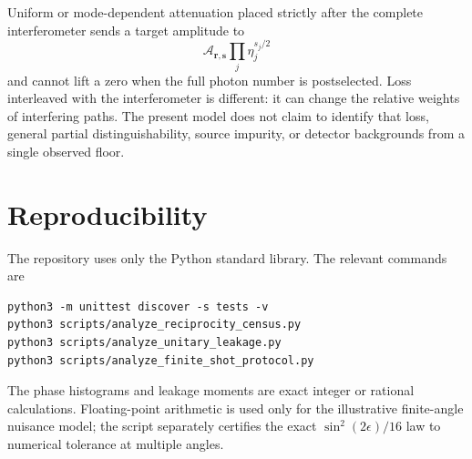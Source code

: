 \documentclass[aps,pra,onecolumn,amsmath,amssymb,superscriptaddress,longbibliography]{revtex4-2}
\begin{document}
Uniform or mode-dependent attenuation placed strictly after the complete
interferometer sends a target amplitude to
\begin{equation}
\mathcal A_{\bm r,\bm s}\prod_j\eta_j^{s_j/2}
\end{equation}
and cannot lift a zero when the full photon number is postselected.
Loss interleaved with the interferometer is different: it can change the
relative weights of interfering paths.  The present model does not claim to
identify that loss, general partial distinguishability, source impurity, or
detector backgrounds from a single observed floor.

\section{Reproducibility}

The repository uses only the Python standard library.  The relevant commands
are
\begin{verbatim}
python3 -m unittest discover -s tests -v
python3 scripts/analyze_reciprocity_census.py
python3 scripts/analyze_unitary_leakage.py
python3 scripts/analyze_finite_shot_protocol.py
\end{verbatim}
The phase histograms and leakage moments are exact integer or rational
calculations.  Floating-point arithmetic is used only for the illustrative
finite-angle nuisance model; the script separately certifies the exact
$\sin^2(2\epsilon)/16$ law to numerical tolerance at multiple angles.
\end{document}
